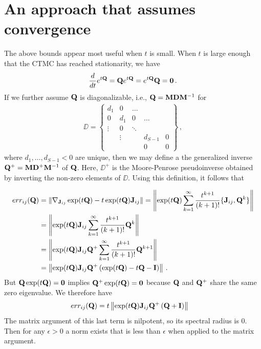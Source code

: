 \documentclass[12pt]{article} %
\begin{document}
\section{An approach that assumes convergence}
The above bounds appear most useful when $t$ is small.
 When $t$ is large enough that the CTMC has reached stationarity, we have 
 \begin{align*}
 	\frac{d}{dt}e^{t\mathbf{Q}} =  \mathbf{Q} e^{t\mathbf{Q}}=e^{t\mathbf{Q}} \mathbf{Q}  = \boldsymbol{0} \, .
 \end{align*}
 If we further assume $\mathbf{Q}$ is diagonalizable, i.e., $\mathbf{Q}=\mathbf{M} \mathbf{D} \mathbf{M}^{-1}$ for 
 \begin{align*}
 	\DD = \begin{Bmatrix}
 		d_1& 0 &\dots & & \\
 		0  & d_1 &0  & \dots& \\
 		\vdots &0 & \ddots & \\
 		 & \vdots& & d_{S-1} &0 \\
 		 &&&0&0
 	\end{Bmatrix} \, ,
 \end{align*}
 where $d_1,\dots,d_{S-1}<0$ are unique, then we may define a the generalized inverse $\mathbf{Q}^+=\mathbf{M} \mathbf{D}^{+} \mathbf{M}^{-1}$ of $\mathbf{Q}$. Here, $\DD^+$ is the Moore-Penrose pseudoinverse obtained by inverting the non-zero elements of $\DD$.  Using this definition, it follows that

		\begin{align*}
			err_{ij}(\mathbf{Q}) &=	\Vert\nabla_{\mathbf{J}_{ij}} \exp(t\mathbf{Q}) - t \exp(t\mathbf{Q})\mathbf{J}_{ij} \Vert = \left\Vert \exp(t\mathbf{Q})  \sum_{k=1}^\infty \frac{t^{k+1}}{(k+1)!} \{\mathbf{J}_{ij},\mathbf{Q}^k\} \right\Vert \\
		&=\left\Vert \exp(t\mathbf{Q}) \mathbf{J}_{ij}  \sum_{k=1}^\infty \frac{t^{k+1}}{(k+1)!} \mathbf{Q}^k \right\Vert \\
		&= \left\Vert \exp(t\mathbf{Q}) \mathbf{J}_{ij} \mathbf{Q}^+ \sum_{k=1}^\infty \frac{t^{k+1}}{(k+1)!} \mathbf{Q}^{k+1} \right\Vert \\
		&= \left\Vert \exp(t\mathbf{Q}) \mathbf{J}_{ij} \mathbf{Q}^+ \left( \exp(t\mathbf{Q})-t\mathbf{Q}-\mathbf{I} \right) \right\Vert  \, .
	\end{align*}
But $\mathbf{Q}\exp(t\mathbf{Q})= \boldsymbol{0}$ implies $\mathbf{Q}^+\exp(t\mathbf{Q})= \boldsymbol{0}$ because $\mathbf{Q}$ and $\mathbf{Q}^+$ share the same zero eigenvalue. We therefore have
\begin{align*}
err_{ij}(\mathbf{Q}) &=t \left\Vert \exp(t\mathbf{Q}) \mathbf{J}_{ij} \mathbf{Q}^+ \left( \mathbf{Q}+\mathbf{I} \right) \right\Vert 
\end{align*}
The matrix argument of this last term is nilpotent, so its spectral radius is 0.  Then for any $\epsilon>0$ a norm exists that is less than $\epsilon$ when applied to the matrix argument.
\end{document}
